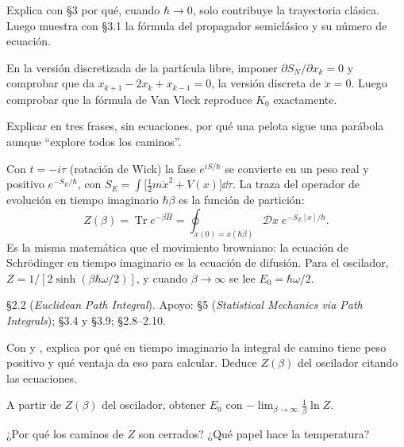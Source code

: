 \begin{prompt}
Explica con  \S3 por qué, cuando $\hbar\to0$, solo contribuye la trayectoria clásica. Luego muestra con  \S3.1 la fórmula del propagador semiclásico y su número de ecuación.
\end{prompt}

En la versión discretizada de la partícula libre, imponer $\partial S_N/\partial x_k=0$ y comprobar que da $x_{k+1}-2x_k+x_{k-1}=0$, la versión discreta de $\ddot x=0$. Luego comprobar que la fórmula de Van Vleck reproduce $K_0$ exactamente.

Explicar en tres frases, sin ecuaciones, por qué una pelota sigue una parábola aunque ``explore todos los caminos''.


Con $t=-i\tau$ (rotación de Wick) la fase $e^{iS/\hbar}$ se convierte en un peso real y positivo $e^{-S_E/\hbar}$, con $S_E=\int\big[\tfrac12m\dot x^2+V(x)\big]\dd\tau$. La traza del operador de evolución en tiempo imaginario $\hbar\beta$ es la función de partición:
\[
Z(\beta)=\operatorname{Tr}e^{-\beta\hat H}=\oint_{x(0)=x(\hbar\beta)}\mathcal Dx\;e^{-S_E[x]/\hbar}.
\]
Es la misma matemática que el movimiento browniano: la ecuación de Schrödinger en tiempo imaginario es la ecuación de difusión. Para el oscilador, $Z=1/[2\sinh(\beta\hbar\omega/2)]$, y cuando $\beta\to\infty$ se lee $E_0=\hbar\omega/2$.

 \S2.2 (\textit{Euclidean Path Integral}). Apoyo:  \S5 (\textit{Statistical Mechanics via Path Integrals});  \S3.4 y \S3.9;  \S2.8--2.10.

\begin{prompt}
Con  y , explica por qué en tiempo imaginario la integral de camino tiene peso positivo y qué ventaja da eso para calcular. Deduce $Z(\beta)$ del oscilador citando las ecuaciones.
\end{prompt}

A partir de $Z(\beta)$ del oscilador, obtener $E_0$ con $-\lim_{\beta\to\infty}\frac1\beta\ln Z$.

¿Por qué los caminos de $Z$ son cerrados? ¿Qué papel hace la temperatura?


